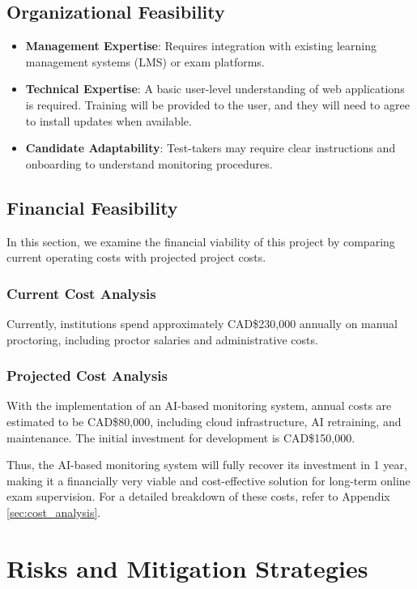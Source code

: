 \documentclass[12pt,a4paper]{article}
\begin{document}
\subsection{Organizational Feasibility}
\begin{itemize}
\item \textbf{Management Expertise}: Requires integration with existing learning management systems (LMS) or exam platforms.
\item \textbf{Technical Expertise}: A basic user-level understanding of web applications is required. Training will be provided to the user, and they will need to agree to install updates when available.

\item \textbf{Candidate Adaptability}: Test-takers may require clear instructions and onboarding to understand monitoring procedures.
\end{itemize}

\subsection{Financial Feasibility}

In this section, we examine the financial viability of this project by comparing current operating costs with projected project costs.

\subsubsection{Current Cost Analysis}
Currently, institutions spend approximately CAD\$230,000 annually on manual proctoring, including proctor salaries and administrative costs.

\subsubsection{Projected Cost Analysis}
With the implementation of an AI-based monitoring system, annual costs are estimated to be CAD\$80,000, including cloud infrastructure, AI retraining, and maintenance. The initial investment for development is CAD\$150,000.


\noindent Thus, the AI-based monitoring system will fully recover its investment in 1 year, making it a financially very viable and cost-effective solution for long-term online exam supervision.
For a detailed breakdown of these costs, refer to Appendix \ref{sec:cost_analysis}.

\section{Risks and Mitigation Strategies}
\end{document}
